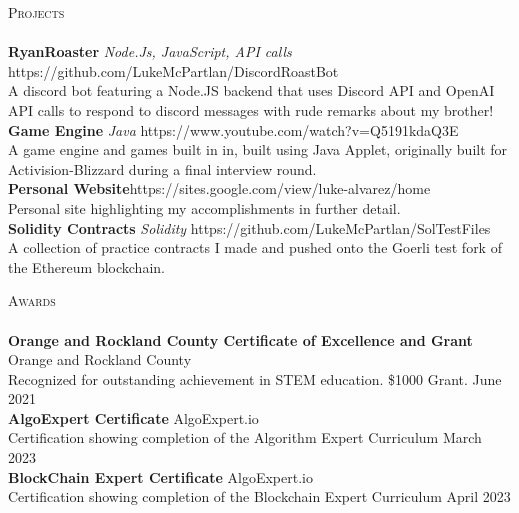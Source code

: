 \documentclass[a4paper]{article}
\newcommand{\lineunder} {
    \vspace*{-8pt} \\
    \hspace*{-18pt} \hrulefill \\
}
\newcommand{\header} [1] {
    {\hspace*{-18pt}\vspace*{6pt} \textsc{#1}}
    \vspace*{-6pt} \lineunder
}
\begin{document}
\header{Projects}
{\textbf{RyanRoaster}} {\sl Node.Js, JavaScript, API calls} \hfill https://github.com/LukeMcPartlan/DiscordRoastBot\\
A discord bot featuring a Node.JS backend that uses Discord API and OpenAI API calls to respond to discord messages with rude remarks about my brother!\\
\vspace*{2mm}
{\textbf{Game Engine}} {\sl Java} \hfill https://www.youtube.com/watch?v=Q5191kdaQ3E\\
A game engine and games built in in, built using Java Applet, originally built for Activision-Blizzard during a final interview round.\\
\vspace*{2mm}
{\textbf{Personal Website}}\hfill https://sites.google.com/view/luke-alvarez/home\\
Personal site highlighting my accomplishments in further detail.\\
\vspace*{2mm}
{\textbf{Solidity Contracts}} {\sl Solidity} \hfill https://github.com/LukeMcPartlan/SolTestFiles\\
A collection of practice contracts I made and pushed onto the Goerli test fork of the Ethereum blockchain.\\
\vspace*{2mm}

\header{Awards}
\textbf{Orange and Rockland County Certificate of Excellence and Grant} \hfill Orange and Rockland County\\
Recognized for outstanding achievement in STEM education. \$1000 Grant. \hfill June 2021\\
\vspace*{2mm}
\textbf{AlgoExpert Certificate} \hfill AlgoExpert.io\\
Certification showing completion of the Algorithm Expert Curriculum \hfill March 2023\\
\vspace*{2mm}
\textbf{BlockChain Expert Certificate} \hfill AlgoExpert.io\\
Certification showing completion of the Blockchain Expert Curriculum \hfill April 2023\\
\vspace*{2mm}

\ 
\end{document}
